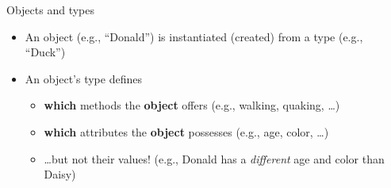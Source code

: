 \documentclass[aspectratio=169]{beamer}
\begin{document}
\begin{frame}{Objects and types}
    \begin{itemize}
        \item An object (e.g., ``Donald'') is instantiated (created) from a \alert{type} (e.g., ``Duck'')
        \item An object's \alert{type} defines
        \begin{itemize}
            \item \textbf{which} methods the \textbf{object} offers (e.g., walking, quaking, \ldots)
            \item \textbf{which} attributes the \textbf{object} possesses (e.g., age, color, \ldots)
            \item \alert{\ldots but not their values!} (e.g., Donald has a \emph{different} age and color than Daisy)
        \end{itemize}
    \end{itemize}
\end{frame}
\end{document}
